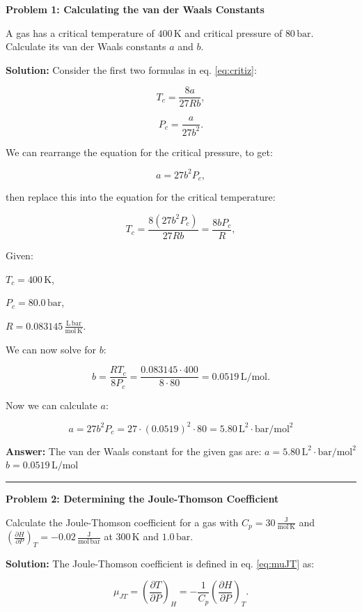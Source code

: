\documentclass[
  9pt,
]{extbook}
\theoremstyle{definition}
\theoremstyle{definition}
\theoremstyle{definition}
\theoremstyle{remark}
\begin{document}
\textbf{Problem 1: Calculating the van der Waals Constants}

A gas has a critical temperature of \(400\,\text{K}\) and critical pressure of \(80\,\text{bar}\). Calculate its van der Waals constants \(a\) and \(b\).

\textbf{Solution:} Consider the first two formulas in eq. \eqref{eq:critiz}:

\[T_c = \frac{8a}{27Rb},\]

\[P_c = \frac{a}{27b^2}.\]

We can rearrange the equation for the critical pressure, to get:

\[a = 27b^2P_c,\]

then replace this into the equation for the critical temperature:

\[T_c = \frac{8(27b^2P_c)}{27Rb} = \frac{8bP_c}{R},\]

Given:

\(T_c = 400\,\text{K}\),

\(P_c = 80.0\,\text{bar}\),

\(R = 0.083145\,\frac{\text{L}\,\text{bar}}{\text{mol}\,\text{K}}\).

We can now solve for \(b\):

\[b = \frac{RT_c}{8P_c} = \frac{0.083145 \cdot 400}{8 \cdot 80} = 0.0519\,\text{L}/\text{mol}.\]

Now we can calculate \(a\):

\[a = 27b^2P_c = 27 \cdot (0.0519)^2 \cdot 80 = 5.80\,\text{L}^2\cdot\text{bar}/\text{mol}^2\]

\textbf{Answer:} The van der Waals constant for the given gas are:
\(a = 5.80\,\text{L}^2\cdot\text{bar}/\text{mol}^2\)
\(b = 0.0519\,\text{L}/\text{mol}\)

\begin{center}\rule{0.5\linewidth}{0.5pt}\end{center}

\textbf{Problem 2: Determining the Joule-Thomson Coefficient}

Calculate the Joule-Thomson coefficient for a gas with \(C_p = 30\,\frac{\text{J}}{\text{mol}\,\text{K}}\) and \(\left(\frac{\partial H}{\partial P}\right)_T = -0.02\,\frac{\text{J}}{\text{mol}\,\text{bar}}\) at \(300\,\text{K}\) and \(1.0\,\text{bar}\).

\textbf{Solution:} The Joule-Thomson coefficient is defined in eq. \eqref{eq:muJT} as:

\[\mu_{JT} = \left(\frac{\partial T}{\partial P}\right)_H = -\frac{1}{C_p}\left(\frac{\partial H}{\partial P}\right)_T.\]
\end{document}
